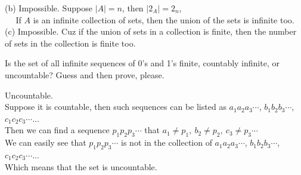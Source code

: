 \documentclass[11pt, a4paper, UTF8]{ctexart}
\begin{document}
\begin{solution}
    (b) Impossible. Suppose $|A| = n$, then $|2_{A}| = 2_{n}$,\\
    $~~~~~~$If $A$ is an infinite collection of sets, then the union of the 
    sets is infinite too.\\
    (c) Impossible. Cuz if the union of sets in a collection is finite, then 
    the number of sets in the collection is finite too.
\end{solution}
\begin{problem}[UD: 22.3]
    Is the set of all infinite sequences of 0's and 1's finite, countably 
  infinite, or uncountable? Guess and then prove, please.
\end{problem}

\begin{revision}
    Uncountable.\\
    Suppose it is countable, then such sequences can be listed as $a_{1}a_{2}a_{3}\cdots$, 
    $b_{1}b_{2}b_{3}\cdots$, $c_{1}c_{2}c_{3}\cdots$...\\
    Then we can find a sequence $p_{1}p_{2}p_{3}\cdots$ that 
    $a_{1} \neq p_{1},~b_{2} \neq p_{2},~c_{3} \neq p_{3}\cdots$\\
    We can easily see that $p_{1}p_{2}p_{3}\cdots$ is not in the collection 
    of $a_{1}a_{2}a_{3}\cdots$, $b_{1}b_{2}b_{3}\cdots$, $c_{1}c_{2}c_{3}\cdots$...\\
    Which means that the set is uncountable.
\end{revision}

\end{document}
